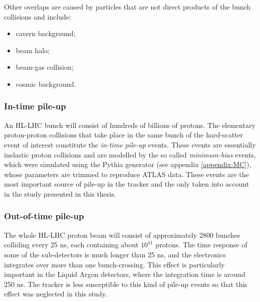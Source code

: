 \documentclass[a4paper,twoside,12pt]{article}
\begin{document}
Other overlaps are caused by particles that are not direct products of the bunch collisions and include:

\begin{itemize}
\item cavern background;
\item beam halo;
\item beam-gas collision;
\item cosmic background.
\end{itemize}

\subsubsection*{In-time pile-up}
An HL-LHC bunch will consist of hundreds of billions of protons. The elementary
proton-proton collisions that take place in the same bunch of the hard-scatter event of
interest constitute the \textit{in-time pile-up} events. These events are essentially inelastic proton collisions and are modelled by the so called
\textit{minimum-bias} events, which were simulated using the Pythia generator (see appendix \ref{appendix:MC}), whose parameters
are trimmed to reproduce ATLAS data. These events are the most
important source of pile-up in the tracker and the only taken into account in the study presented in this thesis. \\

\subsubsection*{Out-of-time pile-up}
The whole HL-LHC proton beam will consist of approximately 2800 bunches colliding every 25 ns, each containing about $10^{11}$ protons. The time response of some of the 
sub-detectors is much longer than 25 ns, and the electronics integrates over more than one
bunch-crossing. This effect is particularly important in the Liquid Argon detectors, where
the integration time is around 250 ns\cite{ATLAS_pileup}. The tracker is less susceptible to this kind of 
pile-up events so that this effect was neglected in this study.
\end{document}
